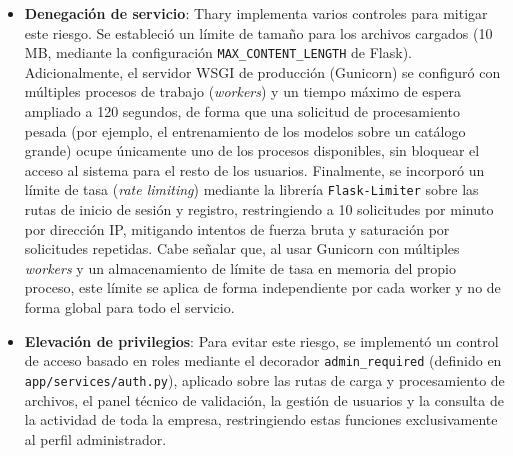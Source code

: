 \begin{itemize}
\begin{verbatim}
def carpeta_resultados(empresa_id):
    ruta = os.path.join(current_app.config["RESULTADOS_FOLDER_BASE"], empresa_id)
    os.makedirs(ruta, exist_ok=True)
    return ruta
    \end{verbatim}

    \item \textbf{Denegación de servicio}: Thary implementa varios controles para mitigar este riesgo. Se estableció un límite de tamaño para los archivos cargados (10 MB, mediante la configuración \texttt{MAX\_CONTENT\_LENGTH} de Flask). Adicionalmente, el servidor WSGI de producción (Gunicorn) se configuró con múltiples procesos de trabajo (\textit{workers}) y un tiempo máximo de espera ampliado a 120 segundos, de forma que una solicitud de procesamiento pesada (por ejemplo, el entrenamiento de los modelos sobre un catálogo grande) ocupe únicamente uno de los procesos disponibles, sin bloquear el acceso al sistema para el resto de los usuarios. Finalmente, se incorporó un límite de tasa (\textit{rate limiting}) mediante la librería \texttt{Flask-Limiter} sobre las rutas de inicio de sesión y registro, restringiendo a 10 solicitudes por minuto por dirección IP, mitigando intentos de fuerza bruta y saturación por solicitudes repetidas. Cabe señalar que, al usar Gunicorn con múltiples \textit{workers} y un almacenamiento de límite de tasa en memoria del propio proceso, este límite se aplica de forma independiente por cada worker y no de forma global para todo el servicio.

    \item \textbf{Elevación de privilegios}: Para evitar este riesgo, se implementó un control de acceso basado en roles mediante el decorador \texttt{admin\_required} (definido en \texttt{app/services/auth.py}), aplicado sobre las rutas de carga y procesamiento de archivos, el panel técnico de validación, la gestión de usuarios y la consulta de la actividad de toda la empresa, restringiendo estas funciones exclusivamente al perfil administrador.
    
\end{itemize}